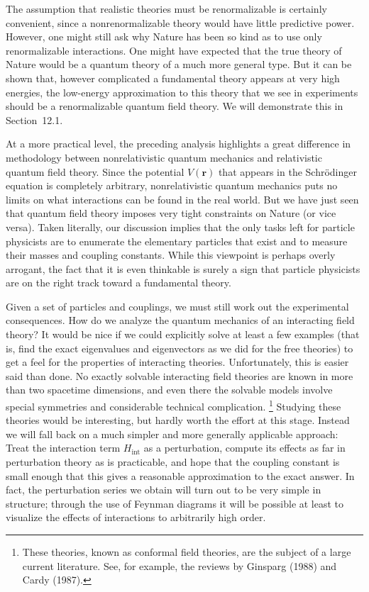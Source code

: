 The assumption that realistic theories must be renormalizable is certainly
convenient, since a nonrenormalizable theory would have little predictive
power.  However, one might still ask why Nature has been so kind as to use
only renormalizable interactions.  One might have expected that the true
theory of Nature would be a quantum theory of a much more general type.  But
it can be shown that, however complicated a fundamental theory appears at
very high energies, the low-energy approximation to this theory that we see
in experiments should be a renormalizable quantum field theory.  We will
demonstrate this in Section~12.1.

At a more practical level, the preceding analysis highlights a great
difference in methodology between nonrelativistic quantum mechanics and
relativistic quantum field theory.  Since the potential $V(\mathbf{r})$ that
appears in the Schr\"odinger equation is completely arbitrary, nonrelativistic
quantum mechanics puts no limits on what interactions can be found in the
real world.  But we have just seen that quantum field theory imposes very
tight constraints on Nature (or vice versa).  Taken literally, our discussion
implies that the only tasks left for particle physicists are to enumerate the
elementary particles that exist and to measure their masses and coupling
constants.  While this viewpoint is perhaps overly arrogant, the fact that it
is even thinkable is surely a sign that particle physicists are on the right
track toward a fundamental theory.

Given a set of particles and couplings, we must still work out the
experimental consequences.  How do we analyze the quantum mechanics of an
interacting field theory?  It would be nice if we could explicitly solve at
least a few examples (that is, find the exact eigenvalues and eigenvectors as
we did for the free theories) to get a feel for the properties of interacting
theories.  Unfortunately, this is easier said than done.  No exactly solvable
interacting field theories are known in more than two spacetime dimensions,
and even there the solvable models involve special symmetries and
considerable technical complication.%
\footnote{These theories, known as conformal field theories, are the subject
of a large current literature.  See, for example, the reviews by Ginsparg
(1988) and Cardy (1987).}  Studying these theories would be interesting, but
hardly worth the effort at this stage.  Instead we will fall back on a much
simpler and more generally applicable approach: Treat the interaction term
$H_{\mathrm{int}}$ as a perturbation, compute its effects as far in
perturbation theory as is practicable, and hope that the coupling constant is
small enough that this gives a reasonable approximation to the exact answer.
In fact, the perturbation series we obtain will turn out to be very simple in
structure; through the use of Feynman diagrams it will be possible at least
to visualize the effects of interactions to arbitrarily high order.


